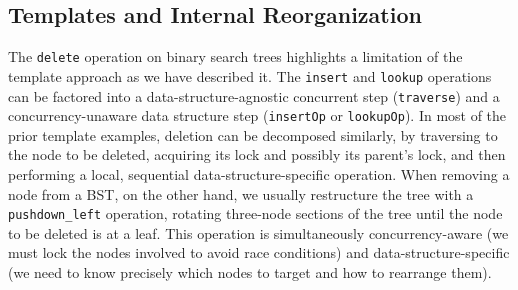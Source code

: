\documentclass[sigplan,screen]{acmart}
\newcommand{\treerep}{\ensuremath{\mathsf{Abs}}}
\begin{document}

\subsection{Templates and Internal Reorganization}
\label{internal_reorganize}
The \lstinline{delete} operation on binary search trees highlights a limitation of the template approach as we have described it. The \lstinline{insert} and \lstinline{lookup} operations can be factored into a data-structure-agnostic concurrent step (\lstinline{traverse}) and a concurrency-unaware data structure step (\lstinline{insertOp} or \lstinline{lookupOp}). In most of the prior template examples, deletion can be decomposed similarly, by traversing to the node to be deleted, acquiring its lock and possibly its parent's lock, and then performing a local, sequential data-structure-specific operation. When removing a node from a BST, on the other hand, we usually restructure the tree with a \lstinline{pushdown_left} operation, %
rotating three-node sections of the tree until the node to be deleted is at a leaf. This operation is simultaneously concurrency-aware (we must lock the nodes involved to avoid race conditions) and data-structure-specific (we need to know precisely which nodes to target and how to rearrange them).
\end{document}
